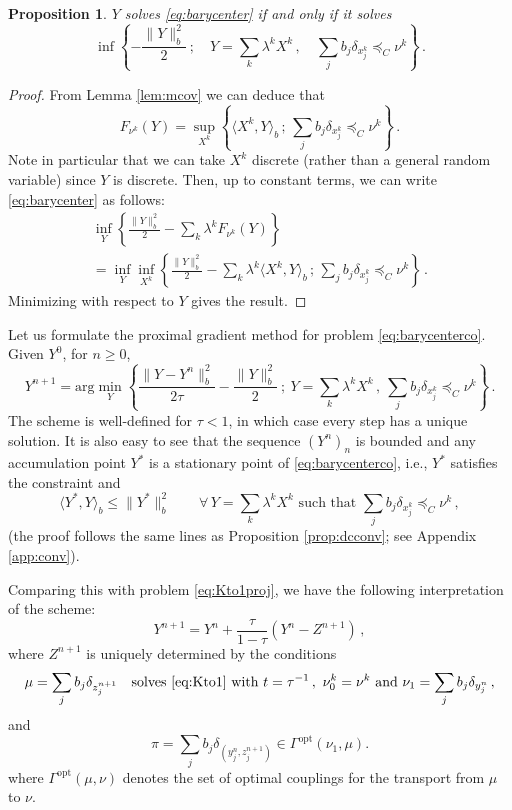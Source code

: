 \documentclass[12pt]{amsart}
\numberwithin{equation}{section}
\let\mr=\mathrm
\theoremstyle{plain}
\newtheorem{proposition}[theorem]{Proposition}
\theoremstyle{definition}
\begin{document}
\begin{proposition} \label{prop:barycenterco} $Y$ solves \eqref{eq:barycenter} if and only if it solves
\begin{equation}\label{eq:barycenterco}
\inf \left\{ - \frac{\|Y\|^2_b}{2}~;\quad Y = \sum_k \lambda^k X^k\,, \quad \sum_j b_j \delta_{x_j^k} \preceq_C \nu^k\right\} \,.
\end{equation}
\end{proposition}
\begin{proof} From Lemma \ref{lem:mcov} we can deduce that
\[
F_{\nu^k}(Y) = \sup_{X^k} \left\{ \langle  X^k,Y\rangle_b\,;\, \sum_j b_j \delta_{x_j^k} \preceq_C \nu^k \right\}\,.
\]
Note in particular that we can take $X^k$ discrete (rather than a general random variable) since $Y$ is discrete. Then, up to constant terms, we can write \eqref{eq:barycenter} as follows:
\begin{multline}\label{eq:decomposition}
\inf_Y \left\{ \frac{\|Y\|^2_b}{2} - \sum_k \lambda^k F_{\nu^k}(Y) \right\} \\= \inf_Y \inf_{X^k} \left\{ \frac{\|Y\|^2_b}{2} - \sum_k \lambda^k \langle  X^k,Y\rangle_b\,;\, \sum_j b_j \delta_{x_j^k} \preceq_C \nu^k \right\}\,.
\end{multline}
Minimizing with respect to $Y$ gives the result.
\end{proof}

Let us formulate the proximal gradient method for problem \eqref{eq:barycenterco}. Given $Y^0$, for $n\geq 0$, 
\begin{equation}\label{eq:implicitquant}
Y^{n+1} = \mr{arg}\min_{Y} \left\{ \frac{\|Y- Y^n\|^2_b}{2\tau}- \frac{\|Y\|^2_b}{2}~;~ Y = \sum_k \lambda^k X^k\,,~ \sum_j b_j \delta_{x_j^k} \preceq_C \nu^k\right\}\,.
\end{equation}
The scheme is well-defined for $\tau<1$, in which case every step has a unique solution. It is also easy to see that the sequence $(Y^n)_n$ is bounded and any accumulation point $Y^*$ is a stationary point of \eqref{eq:barycenterco}, i.e., $Y^*$ satisfies the constraint and 
\begin{equation}\label{eq:opty}
\langle Y^*, Y\rangle_b \leq  \| Y^*\|^2_b \qquad \forall \,Y= \sum_k \lambda^k X^k \text{ such that } \sum_j b_j \delta_{x_j^k} \preceq_C \nu^k\,,
\end{equation}
(the proof follows the same lines as Proposition \ref{prop:dcconv}; see Appendix \ref{app:conv}).

Comparing this with problem \eqref{eq:Kto1proj}, we have the following interpretation of the scheme: 
\[
Y^{n+1} = Y^{n} + \frac{\tau}{1-\tau} (Y^n - Z^{n+1})\,,     
\]
where $Z^{n+1}$ is uniquely determined by the conditions
\[
\mu = \sum_j b_j \delta_{z_j^{n+1}}~~ \text{ solves \eqref{eq:Kto1} with } t = \tau^{-1}\,, ~\nu_0^k = \nu^k \text{ and } \nu_1 = \sum_{j} b_j \delta_{y^n_j}\,,
\]
and \[ 
\pi = \sum_j b_j \delta_{(y_j^{n},z_j^{n+1})} \in \Gamma^{\mr{opt}}(\nu_1,\mu).
\]
where $\Gamma^{\mr{opt}}(\mu,\nu)$ denotes the set of optimal couplings for the transport from $\mu$ to $\nu$.
\end{document}
